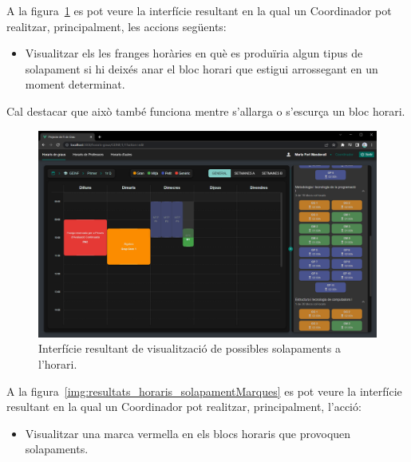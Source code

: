 \documentclass[a4paper,12pt]{ThesisStyle}
\begin{document}
\newpage

A la figura~\ref{img:resultats_horaris_solapamentDrag} es pot veure la interfície resultant en la qual un Coordinador pot realitzar, principalment, les accions següents:
\begin{itemize}
  \item Visualitzar els les franges horàries en què es produïria algun tipus de solapament si hi deixés anar el bloc horari que estigui arrossegant en un moment determinat.
\end{itemize}

Cal destacar que això també funciona mentre s'allarga o s'escurça un bloc horari.

\begin{figure}[H]
  \centering
  \includegraphics[width=\textwidth]{assets/results/horaris/solapamentDrag.png}
  \caption{\label{img:resultats_horaris_solapamentDrag}Interfície resultant de visualització de possibles solapaments a l'horari.}
\end{figure}

\newpage

A la figura~\ref{img:resultats_horaris_solapamentMarques} es pot veure la interfície resultant en la qual un Coordinador pot realitzar, principalment, l'acció:
\begin{itemize}
  \item Visualitzar una marca vermella en els blocs horaris que provoquen solapaments.
\end{itemize}
\end{document}
